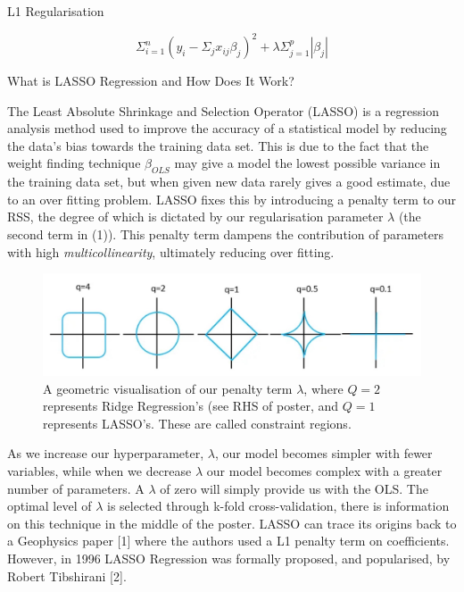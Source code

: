 \documentclass[final]{beamer}
\newlength{\onecolwid}
\begin{document}
\begin{frame}[t]
\begin{columns}[t]
\begin{column}{\onecolwid} %

\vspace{-1.25cm}

\begin{alertblock}{L1 Regularisation}

\begin{equation}\label{eqn:lasso_regression}
\Sigma_{i=1}^{n}(y_i-\Sigma_{j}x_{ij}\beta_j)^2 + \lambda \Sigma_{j=1}^{p}\left|\beta_j\right|
\end{equation}


\end{alertblock}


\begin{block}{What is LASSO Regression and How Does It Work?}
\small{The Least Absolute Shrinkage and Selection Operator (LASSO) is a regression analysis method used to improve the accuracy of a statistical model by reducing the data's bias towards the training data set. This is due to the fact that the weight finding technique {$\beta_{OLS}$} may give a model the lowest possible variance in the training data set, but when given new data rarely gives a good estimate, due to an over fitting problem. LASSO fixes this by introducing a penalty term to our RSS, the degree of which is dictated by our regularisation parameter {$\lambda$} (the second term in (1)). This penalty term dampens the contribution of parameters with high {\emph{multicollinearity}}, ultimately reducing over fitting. 
\\
\begin{figure}
    \centering
    \includegraphics[width=1\linewidth]{Q-values.pdf}
    \caption{\; A geometric visualisation of our penalty term $\lambda$, where $Q=2$ represents Ridge Regression's (see RHS of poster, and $Q=1$ represents LASSO's. These are called constraint regions.}
\end{figure}
As we increase our hyperparameter, {$\lambda$}, our model becomes simpler with fewer variables, while when we decrease {$\lambda$} our model becomes complex with a greater number of parameters. A {$\lambda$} of zero will simply provide us with the OLS. The optimal level of {$\lambda$} is selected through k-fold cross-validation, there is information on this technique in the middle of the poster. LASSO can trace its origins back to a Geophysics paper [1] where the authors used a L1 penalty term on coefficients. However, in 1996 LASSO Regression was formally proposed, and popularised, by Robert Tibshirani [2].}

\end{block}
\end{column}
\end{columns}
\end{frame}
\end{document}
